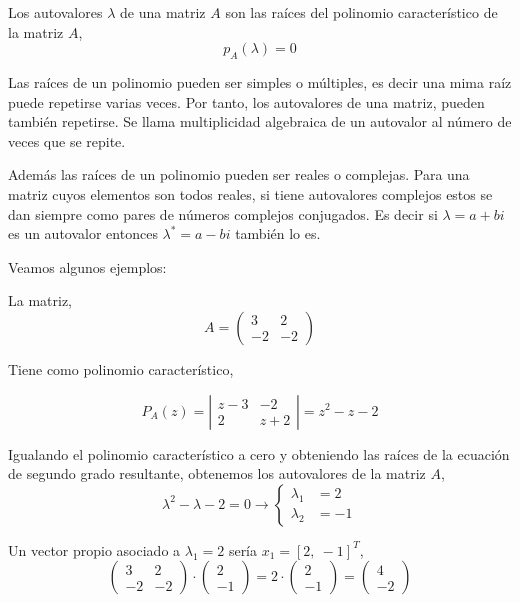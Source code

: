 Los autovalores $\lambda$ de una matriz $A$ son las raíces del polinomio característico de la matriz $A$,
\begin{equation*}
p_A(\lambda)=0
\end{equation*}

Las raíces de un polinomio pueden ser simples o múltiples, es decir una mima raíz puede repetirse varias veces. Por tanto, los autovalores de una matriz, pueden también repetirse. Se llama multiplicidad algebraica de un autovalor al número de veces que se repite.

Además las raíces de un polinomio pueden ser reales o complejas. Para una matriz cuyos elementos son todos reales, si tiene autovalores complejos estos se dan siempre como pares de números complejos conjugados. Es decir si $\lambda =a+bi$ es un autovalor entonces $\lambda^*=a-bi$ también lo es.

Veamos algunos ejemplos:

La matriz,
\begin{equation*}
A=\begin{pmatrix}
3& 2\\
-2& -2
\end{pmatrix}
\end{equation*}

Tiene como polinomio característico,

\begin{equation*}
P_A(z)=\left\vert\begin{matrix}
z-3& -2\\
2& z+2 
\end{matrix} \right\vert=z^2-z-2
\end{equation*}

Igualando el polinomio característico a cero y obteniendo las raíces de la ecuación de segundo grado resultante, obtenemos los autovalores de la matriz $A$,
\begin{equation*}
\lambda^2-\lambda-2=0 \rightarrow \left\{ 
\begin{aligned}
\lambda_1&=2\\
\lambda_2&=-1
\end{aligned}
\right.
\end{equation*}

Un vector propio asociado a $\lambda_1=2$ sería $x_1=[2,\  -1]^T$,
\begin{equation*}
\begin{pmatrix}
3& 2\\
-2& -2
\end{pmatrix}\cdot \begin{pmatrix}
2\\
-1
\end{pmatrix}=2\cdot \begin{pmatrix}
2\\
-1
\end{pmatrix} =\begin{pmatrix}
4\\
-2
\end{pmatrix} 
\end{equation*}

